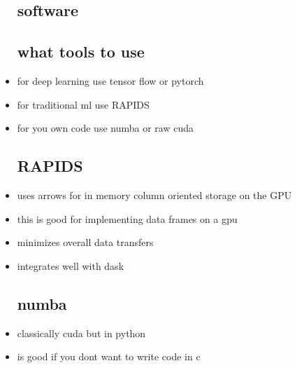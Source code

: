 \documentclass{article}
\begin{document}
\begin{itemize}
\subsection*{software}
\subsection*{what tools to use}
\item for deep learning use tensor flow or pytorch 
\item for traditional ml use RAPIDS
\item for you own code use numba or raw cuda 
\subsection*{RAPIDS}
\item uses arrows for in memory column oriented storage on the GPU
\item this is good for implementing data frames on a gpu 
\item minimizes overall data transfers
\item integrates well with dask
\subsection*{numba }
\item classically cuda but in python
\item is good if you dont want to write code in c 


\end{itemize}
\end{document}
